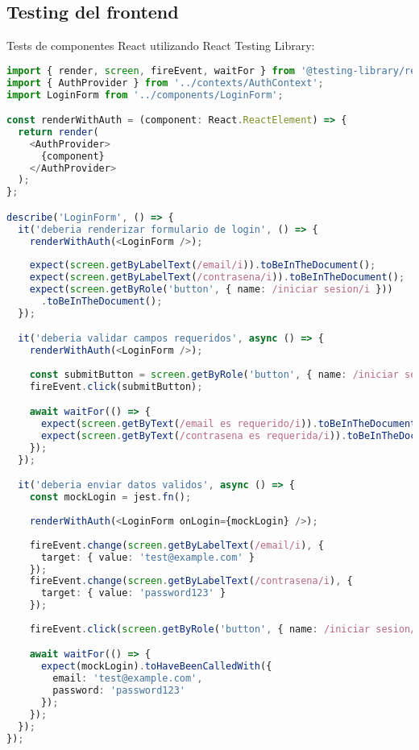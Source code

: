 \subsection{Testing del frontend}

Tests de componentes React utilizando React Testing Library:

\begin{lstlisting}[language=TypeScript, caption=Tests de componentes React]
import { render, screen, fireEvent, waitFor } from '@testing-library/react';
import { AuthProvider } from '../contexts/AuthContext';
import LoginForm from '../components/LoginForm';

const renderWithAuth = (component: React.ReactElement) => {
  return render(
    <AuthProvider>
      {component}
    </AuthProvider>
  );
};

describe('LoginForm', () => {
  it('deberia renderizar formulario de login', () => {
    renderWithAuth(<LoginForm />);
    
    expect(screen.getByLabelText(/email/i)).toBeInTheDocument();
    expect(screen.getByLabelText(/contrasena/i)).toBeInTheDocument();
    expect(screen.getByRole('button', { name: /iniciar sesion/i }))
      .toBeInTheDocument();
  });

  it('deberia validar campos requeridos', async () => {
    renderWithAuth(<LoginForm />);
    
    const submitButton = screen.getByRole('button', { name: /iniciar sesión/i });
    fireEvent.click(submitButton);

    await waitFor(() => {
      expect(screen.getByText(/email es requerido/i)).toBeInTheDocument();
      expect(screen.getByText(/contrasena es requerida/i)).toBeInTheDocument();
    });
  });

  it('deberia enviar datos validos', async () => {
    const mockLogin = jest.fn();
    
    renderWithAuth(<LoginForm onLogin={mockLogin} />);
    
    fireEvent.change(screen.getByLabelText(/email/i), {
      target: { value: 'test@example.com' }
    });
    fireEvent.change(screen.getByLabelText(/contrasena/i), {
      target: { value: 'password123' }
    });
    
    fireEvent.click(screen.getByRole('button', { name: /iniciar sesion/i }));

    await waitFor(() => {
      expect(mockLogin).toHaveBeenCalledWith({
        email: 'test@example.com',
        password: 'password123'
      });
    });
  });
});
\end{lstlisting}

